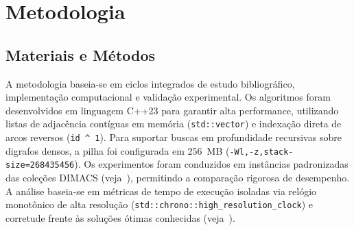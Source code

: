 \section{Metodologia}\label{sec:metodologia}

\subsection{Materiais e Métodos}
A metodologia baseia-se em ciclos integrados de estudo bibliográfico, implementação computacional e validação experimental. Os algoritmos foram desenvolvidos em linguagem C++23 para garantir alta performance, utilizando listas de adjacência contíguas em memória (\lstinline{std::vector}) e indexação direta de arcos reversos (\lstinline{id ^ 1}). Para suportar buscas em profundidade recursivas sobre digrafos densos, a pilha foi configurada em 256~MB (\lstinline{-Wl,-z,stack-size=268435456}).
Os experimentos foram conduzidos em instâncias padronizadas das coleções DIMACS (veja~\cite{Jensen2022}), permitindo a comparação rigorosa de desempenho. A análise baseia-se em métricas de tempo de execução isoladas via relógio monotônico de alta resolução (\lstinline{std::chrono::high_resolution_clock}) e corretude frente às soluções ótimas conhecidas (veja~\cite{ford1956maximal}).

